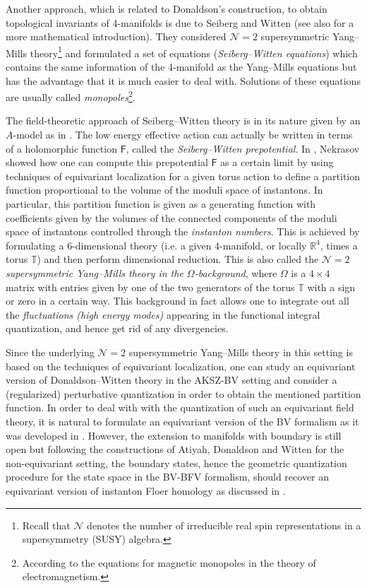 \documentclass[11pt,colorinlistoftodos]{amsart}
\numberwithin{equation}{subsection}
\theoremstyle{plain}
\theoremstyle{definition}
\theoremstyle{remark}
\newcommand{\R}{\mathbb{R}}
\newcommand{\calN}{\mathcal{N}}
\begin{document}
Another approach, which is related to Donaldson's construction, to obtain topological invariants of 4-manifolds is due to Seiberg and Witten \cite{SeibergWitten1994,SeibergWitten1994_2} (see also \cite{Nicolaescu2000} for a more mathematical introduction). They considered $\calN=2$ supersymmetric Yang--Mills theory\footnote{Recall that $\calN$ denotes the number of irreducible real spin representations in a supersymmetry (SUSY) algebra.} and formulated a set of equations (\emph{Seiberg--Witten equations}) which contains the same information of the 4-manifold as the Yang--Mills equations but has the advantage that it is much easier to deal with. Solutions of these equations are usually called \emph{monopoles}\footnote{According to the equations for magnetic monopoles in the theory of electromagnetism.}. 

The field-theoretic approach of Seiberg--Witten theory is in its nature given by an $A$-model as in \cite{Witten1988a}. The low energy effective action can actually be written in terms of a holomorphic function $\mathsf{F}$, called the \emph{Seiberg--Witten prepotential}. In \cite{Nekrasov2003}, Nekrasov showed how one can compute this prepotential $\mathsf{F}$ as a certain limit by using techniques of equivariant localization for a given torus action to define a partition function proportional to the volume of the moduli space of instantons. In particular, this partition function is given as a generating function with coefficients given by the volumes of the connected components of the moduli space of instantons controlled through the \emph{instanton numbers}. This is achieved by formulating a 6-dimensional theory (i.e. a given 4-manifold, or locally $\R^4$, times a torus $\mathbb{T}$) and then perform dimensional reduction. 
This is also called the \emph{$\calN=2$ supersymmetric Yang--Mills theory in the $\Omega$-background}, where $\Omega$ is a $4\times 4$ matrix with entries given by one of the two generators of the torus $\mathbb{T}$ with a sign or zero in a certain way. This background in fact allows one to integrate out all the \emph{fluctuations (high energy modes)} appearing in the functional integral quantization, and hence get rid of any divergencies. 

Since the underlying $\calN=2$ supersymmetric Yang--Mills theory in this setting is based on the techniques of equivariant localization, one can study an equivariant version of Donaldson--Witten theory in the AKSZ-BV setting and consider a (regularized) perturbative quantization in order to obtain the mentioned partition function. In order to deal with with the quantization of such an equivariant field theory, it is natural to formulate an equivariant version of the BV formalism as it was developed in \cite{CattZabz2019}. However, the extension to manifolds with boundary is still open but following the constructions of Atiyah, Donaldson and Witten for the non-equivariant setting, the boundary states, hence the geometric quantization procedure for the state space in the BV-BFV formalism, should recover an equivariant version of instanton Floer homology as discussed in \cite{AustinBraam1996}. 
\end{document}
